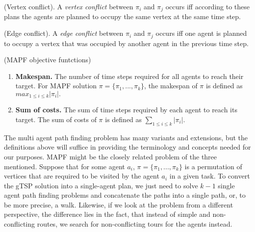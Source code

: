   
 \begin{definition} (Vertex conflict)\cite{mapf}. A \emph{vertex conflict} between $\pi_i$ and $\pi_j$ occurs iff according to these plans the agents are planned to occupy the same vertex at the same time step.
 \end{definition}
 
 
 \begin{definition} (Edge conflict)\cite{mapf}. A \emph{edge conflict} between $\pi_i$ and $\pi_j$ occurs iff one agent is planned to occupy a vertex that was occupied by another agent in the previous time step.
 \end{definition} 


 \begin{definition}(MAPF objective funtctions)\cite{mapf}
 	\begin{enumerate}
 		\item \textbf{Makespan.} The number of time steps required for all agents to reach their target. For MAPF solution $\pi = \{\pi_1,...,\pi_k\}$, the makespan of $\pi$ is defined as $max_{1\leq i \leq k } | \pi_i |.$
 		\item \textbf{Sum of costs.} The sum of time steps required by each agent to reach its target. The sum of costs of  $\pi$ is defined as $ \sum_ {1\leq i \leq k} | \pi_i | .$  
 	\end{enumerate}
 \end{definition}
 
 
 The multi agent path finding problem has many variants and extensions, but the definitions above will suffice in providing the terminology and concepts needed for our purposes. MAPF might be the closely related problem of the three mentioned. Suppose that for some agent $a_i$, $\pi = \{ \pi_1,...,\pi_k \}$ is a permutation of vertices that are required to be visited by the agent $a_i$ in a given task. To convert the gTSP solution into a single-agent plan, we just need to solve $k-1$ single agent path finding problems and concatenate the paths into a single path, or, to be more precise, a walk. Likewise, if we look at the problem from a different perspective, the difference lies in the fact, that instead of simple and non-conflicting routes, we search for non-conflicting tours for the agents instead.
